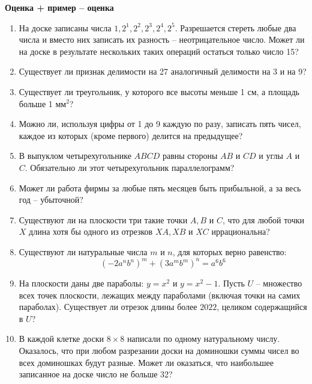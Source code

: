 \documentclass{article}
\begin{document}
\large
	
\begin{center}
	\textbf{Оценка + пример -- оценка}
\end{center}

\begin{enumerate}[label*=\protect\fbox{\arabic{enumi}}]
	
\item На доске записаны числа $1, 2^1, 2^2, 2^3, 2^4, 2^5$. Разрешается стереть любые два числа и вместо них записать их разность – неотрицательное число. 
Может ли на доске в результате нескольких таких операций остаться только число 15?
	
\item Существует ли признак делимости на 27 аналогичный делимости на 3 и на 9?
	
\item Существует ли треугольник, у которого все высоты меньше 1 см, а площадь больше 1 м$м^2$?

\item Можно ли, используя цифры от 1 до 9 каждую по разу, записать пять чисел, каждое из которых (кроме первого) делится на предыдущее?

\item В выпуклом четырехугольнике $ABCD$ равны стороны $AB$ и $CD$ и углы $A$ и $C$. Обязательно ли этот четырехугольник параллелограмм?

\item Может ли работа фирмы за любые пять месяцев быть прибыльной, а за весь год – убыточной?

\item Существуют ли на плоскости три такие точки $A, B$ и $C$, что для любой точки $X$ длина хотя бы одного из отрезков $XA, XB$ и $XC$ иррациональна?

\item Существуют ли натуральные числа $m$ и $n$, для которых верно равенство:  $$(-2a^nb^n)^m + (3a^mb^m)^n = a^6b^6$$

\item На плоскости даны две параболы: $y=x^2$ и $y=x^2-1$. Пусть $U$ – множество всех точек плоскости, лежащих между параболами (включая точки на самих параболах). Существует ли отрезок длины более $2022$, целиком содержащийся в $U$?

\item В каждой клетке доски $8\times 8$ написали по одному натуральному числу. Оказалось, что при любом разрезании доски на доминошки суммы чисел во всех доминошках будут разные. Может ли оказаться, что наибольшее записанное на доске число не больше 32?


\end{enumerate}
\end{document}
